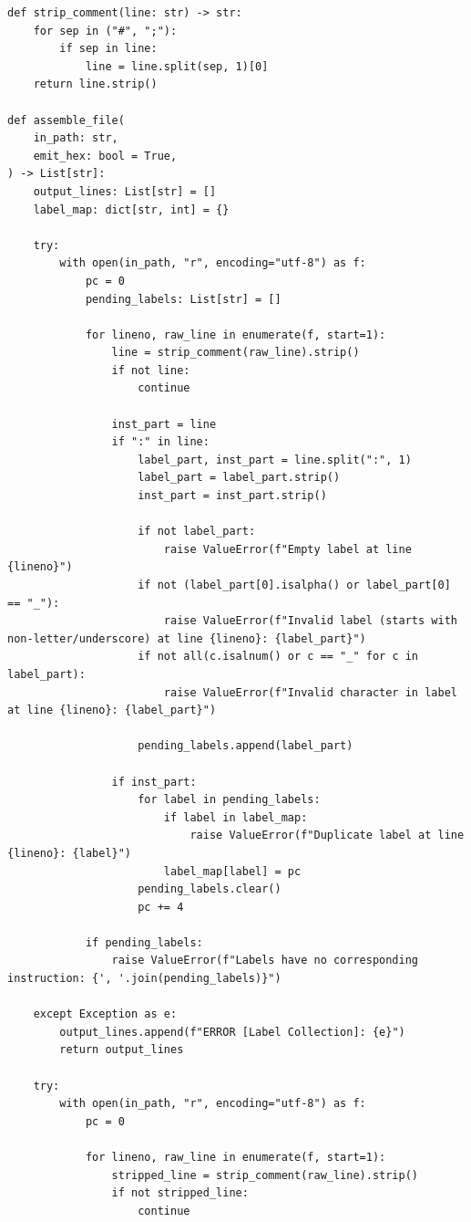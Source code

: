 \documentclass[11pt]{article}
\begin{document}
\begin{lstlisting}[style=mypython, caption=The Assembler Code, label=lst:assembler]
def strip_comment(line: str) -> str:
    for sep in ("#", ";"):
        if sep in line:
            line = line.split(sep, 1)[0]
    return line.strip()

def assemble_file(
    in_path: str,
    emit_hex: bool = True,
) -> List[str]:
    output_lines: List[str] = []
    label_map: dict[str, int] = {}  

    try:
        with open(in_path, "r", encoding="utf-8") as f:
            pc = 0  
            pending_labels: List[str] = []  

            for lineno, raw_line in enumerate(f, start=1):
                line = strip_comment(raw_line).strip()
                if not line:
                    continue

                inst_part = line
                if ":" in line:
                    label_part, inst_part = line.split(":", 1)
                    label_part = label_part.strip()
                    inst_part = inst_part.strip()

                    if not label_part:
                        raise ValueError(f"Empty label at line {lineno}")
                    if not (label_part[0].isalpha() or label_part[0] == "_"):
                        raise ValueError(f"Invalid label (starts with non-letter/underscore) at line {lineno}: {label_part}")
                    if not all(c.isalnum() or c == "_" for c in label_part):
                        raise ValueError(f"Invalid character in label at line {lineno}: {label_part}")

                    pending_labels.append(label_part)

                if inst_part:
                    for label in pending_labels:
                        if label in label_map:
                            raise ValueError(f"Duplicate label at line {lineno}: {label}")
                        label_map[label] = pc
                    pending_labels.clear()
                    pc += 4  

            if pending_labels:
                raise ValueError(f"Labels have no corresponding instruction: {', '.join(pending_labels)}")

    except Exception as e:
        output_lines.append(f"ERROR [Label Collection]: {e}")
        return output_lines

    try:
        with open(in_path, "r", encoding="utf-8") as f:
            pc = 0 

            for lineno, raw_line in enumerate(f, start=1):
                stripped_line = strip_comment(raw_line).strip()
                if not stripped_line:
                    continue  


\end{lstlisting}
\end{document}
